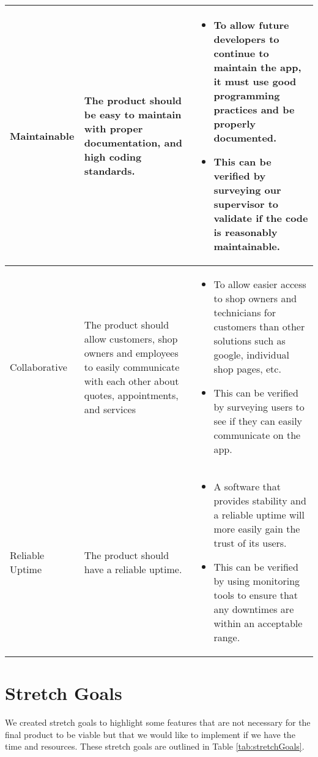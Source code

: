 \documentclass{article}
\begin{document}
\begin{center}
\begin{longtable}{ | p{3cm} | p{4cm} | p{4.5cm} |}
    Maintainable & 
    The product should be easy to maintain with proper documentation, and high coding standards.  &  
    \begin{itemize}[noitemsep,nolistsep,leftmargin=*]
        \item To allow future developers to continue to maintain the app, it must use good programming practices and be properly documented.
        \item This can be verified by surveying our supervisor to validate if the code is reasonably maintainable.
    \end{itemize}
\\ \hline

    Collaborative & 
    The product should allow customers, shop owners and employees to easily communicate with each other about quotes, appointments, and services &  
    \begin{itemize}[noitemsep,nolistsep,leftmargin=*]
        \item To allow easier access to shop owners and technicians for customers than other solutions such as google, individual shop pages, etc.
        \item This can be verified by surveying users to see if they can easily communicate on the app.
    \end{itemize}
\\ \hline

    Reliable Uptime & 
    The product should have a reliable uptime.  &  
    \begin{itemize}[noitemsep,nolistsep,leftmargin=*]
        \item A software that provides stability and a reliable uptime will more easily gain the trust of its users.
        \item This can be verified by using monitoring tools to ensure that any downtimes are within an acceptable range.
    \end{itemize}
    \\ \hline
    \end{longtable}
\end{center}

\section{Stretch Goals}

We created stretch goals to highlight some features that are not necessary for the final product to be viable but that we would like to implement if we have the time and resources. These stretch goals are outlined in Table \ref{tab:stretchGoals}.
\end{document}
